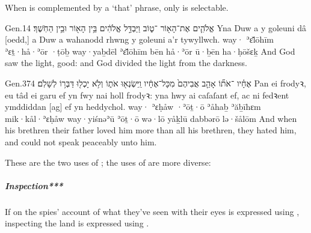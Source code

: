 
\begin{paper}
	{\click} When  is complemented by a  ‘that’ phrase, only  is selectable.
\end{paper}

\begin{example}{Gen.}{1}{4}{}{}
	\quoling
	{ אֱלֹהִ֛ים אֶת־הָא֖וֹר ־ט֑וֹב וַיַּבְדֵּ֣ל אֱלֹהִ֔ים בֵּ֥ין הָא֖וֹר וּבֵ֥ין הַחֹֽשֶׁךְ׃}
	{Yna Duw a  y goleuni  dâ [oedd,] a Duw a wahanodd rhwng y goleuni a’r tywyllwch.}
	{way· ʾɛ̆lōhīm ʾɛṯ·hå·ʾōr ·ṭōḇ way·yaḇdēl ʾɛ̆lōhīm bēn hå·ʾōr ū·ḇēn ha·ḥōšɛḵ}
	{And God saw the light,   good: and God divided the light from the darkness.}
\end{example}

\begin{example}{Gen.}{37}{4}{}{}
	\quoling
	{ אֶחָ֗יו ־אֹת֞וֹ אָהַ֤ב אֲבִיהֶם֙ מִכָּל־אֶחָ֔יו וַֽיִּשְׂנְא֖וּ אֹת֑וֹ וְלֹ֥א יָכְל֖וּ דַּבְּר֥וֹ לְשָׁלֹֽם׃}
	{Pan  ei frodyꝛ,  eu tâd  ei garu ef yn fwy nai holl frodyꝛ: yna hwy ai caſaſant ef, ac ni fedꝛent ymddiddan [ag] ef yn heddychol.}
	{way· ʾɛḥåw ·ʾōṯ·ō ʾåhaḇ ʾăḇīhɛm mik·kål·ʾɛḥåw way·yiśnəʾū ʾōṯ·ō wə·lō yåḵlū dabbərō lə·šålōm}
	{And when his brethren   their father loved him more than all his brethren, they hated him, and could not speak peaceably unto him.}
\end{example}

\begin{paper}
	{\click}{\click} These are the two uses of ; the uses of  are more diverse:
\end{paper}



\paragraph{}

\subparagraph{Inspection*** }

\begin{paper}
	If on  the spies’ account of what they’ve seen with their eyes is expressed using , inspecting \tounfold{***} the land is expressed using .
\end{paper}

